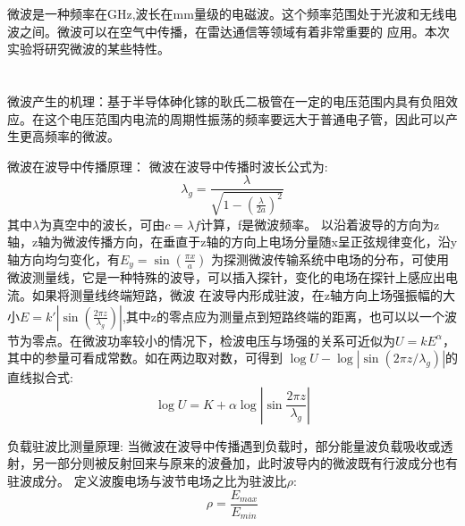﻿\documentclass[10.5pt]{ctexart}
\begin{document}
\title{\textbf{}} %
\author{}
\date{}
\maketitle
\section{\textbf{}}
微波是一种频率在GHz,波长在mm量级的电磁波。这个频率范围处于光波和无线电波之间。微波可以在空气中传播，在雷达通信等领域有着非常重要的
应用。本次实验将研究微波的某些特性。
\section{\textbf{}}

微波产生的机理：基于半导体砷化镓的耿氏二极管在一定的电压范围内具有负阻效应。在这个电压范围内电流的周期性振荡的频率要远大于普通电子管，因此可以产生更高频率的微波。

微波在波导中传播原理：
微波在波导中传播时波长公式为:
\begin{equation}
\lambda_g=\frac{\lambda}{\sqrt{1-(\frac{\lambda}{2a})^2}}
\end{equation}
其中$\lambda$为真空中的波长，可由$c=\lambda f$计算，f是微波频率。
以沿着波导的方向为z轴，z轴为微波传播方向，在垂直于z轴的方向上电场分量随x呈正弦规律变化，沿y轴方向均匀变化，有$E_y=\sin(\frac{\pi x}{a})$
为探测微波传输系统中电场的分布，可使用微波测量线，它是一种特殊的波导，可以插入探针，变化的电场在探针上感应出电流。如果将测量线终端短路，微波
在波导内形成驻波，在z轴方向上场强振幅的大小$E=k'|\sin(\frac{2\pi z}{\lambda_g})|$,其中z的零点应为测量点到短路终端的距离，也可以以一个波节为零点。在微波功率较小的情况下，检波电压与场强的关系可近似为$U=kE^{\alpha}$，其中的参量可看成常数。如在两边取对数，可得到
$\log U - \log |\sin(2 \pi z /\lambda_g)|$的直线拟合式:
\begin{equation}
\log U = K + \alpha \log |\sin \frac{2 \pi z}{\lambda_g}|
\end{equation}

负载驻波比测量原理:
当微波在波导中传播遇到负载时，部分能量波负载吸收或透射，另一部分则被反射回来与原来的波叠加，此时波导内的微波既有行波成分也有驻波成分。
定义波腹电场与波节电场之比为驻波比$\rho$:
\begin{equation}
\rho=\frac{E_{max}}{E_{min}}
\end{equation}
\end{document}
